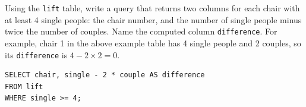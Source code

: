 \begin{blocksection}
\question Using the \lstinline{lift} table, write a query that returns two columns for each chair with at least 4 single people: the chair number, and the number of single people minus twice the number of couples. Name the computed column \lstinline{difference}. For example, chair 1 in the above example table has 4 single people and 2 couples, so its \lstinline{difference} is $4 - 2 \times 2 = 0$.

\begin{solution}[1.5in]
\begin{lstlisting}
SELECT chair, single - 2 * couple AS difference
FROM lift
WHERE single >= 4;
\end{lstlisting}
\end{solution}
\end{blocksection}
